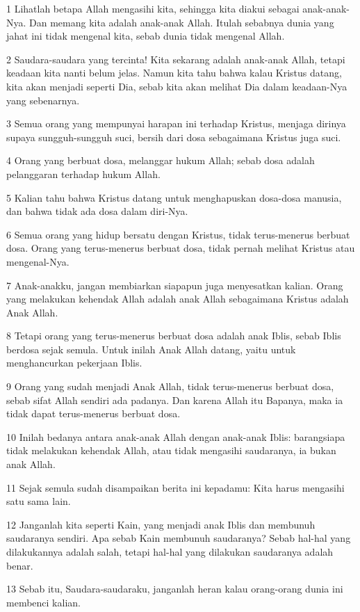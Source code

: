 \par 1 Lihatlah betapa Allah mengasihi kita, sehingga kita diakui sebagai anak-anak-Nya. Dan memang kita adalah anak-anak Allah. Itulah sebabnya dunia yang jahat ini tidak mengenal kita, sebab dunia tidak mengenal Allah.
\par 2 Saudara-saudara yang tercinta! Kita sekarang adalah anak-anak Allah, tetapi keadaan kita nanti belum jelas. Namun kita tahu bahwa kalau Kristus datang, kita akan menjadi seperti Dia, sebab kita akan melihat Dia dalam keadaan-Nya yang sebenarnya.
\par 3 Semua orang yang mempunyai harapan ini terhadap Kristus, menjaga dirinya supaya sungguh-sungguh suci, bersih dari dosa sebagaimana Kristus juga suci.
\par 4 Orang yang berbuat dosa, melanggar hukum Allah; sebab dosa adalah pelanggaran terhadap hukum Allah.
\par 5 Kalian tahu bahwa Kristus datang untuk menghapuskan dosa-dosa manusia, dan bahwa tidak ada dosa dalam diri-Nya.
\par 6 Semua orang yang hidup bersatu dengan Kristus, tidak terus-menerus berbuat dosa. Orang yang terus-menerus berbuat dosa, tidak pernah melihat Kristus atau mengenal-Nya.
\par 7 Anak-anakku, jangan membiarkan siapapun juga menyesatkan kalian. Orang yang melakukan kehendak Allah adalah anak Allah sebagaimana Kristus adalah Anak Allah.
\par 8 Tetapi orang yang terus-menerus berbuat dosa adalah anak Iblis, sebab Iblis berdosa sejak semula. Untuk inilah Anak Allah datang, yaitu untuk menghancurkan pekerjaan Iblis.
\par 9 Orang yang sudah menjadi Anak Allah, tidak terus-menerus berbuat dosa, sebab sifat Allah sendiri ada padanya. Dan karena Allah itu Bapanya, maka ia tidak dapat terus-menerus berbuat dosa.
\par 10 Inilah bedanya antara anak-anak Allah dengan anak-anak Iblis: barangsiapa tidak melakukan kehendak Allah, atau tidak mengasihi saudaranya, ia bukan anak Allah.
\par 11 Sejak semula sudah disampaikan berita ini kepadamu: Kita harus mengasihi satu sama lain.
\par 12 Janganlah kita seperti Kain, yang menjadi anak Iblis dan membunuh saudaranya sendiri. Apa sebab Kain membunuh saudaranya? Sebab hal-hal yang dilakukannya adalah salah, tetapi hal-hal yang dilakukan saudaranya adalah benar.
\par 13 Sebab itu, Saudara-saudaraku, janganlah heran kalau orang-orang dunia ini membenci kalian.
